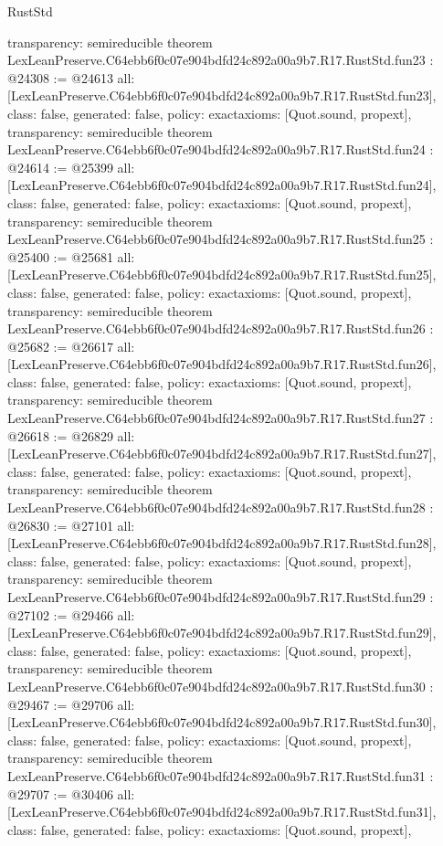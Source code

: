 \begin{lexlean}{RustStd}
\begin{coremodule}
{  transparency: semireducible
}
theorem LexLeanPreserve.C64ebb6f0c07e904bdfd24c892a00a9b7.R17.RustStd.fun23 : @24308 := @24613 {
  all: [LexLeanPreserve.C64ebb6f0c07e904bdfd24c892a00a9b7.R17.RustStd.fun23],
  class: false,
  generated: false,
  policy: exact{axioms: [Quot.sound, propext]},
  transparency: semireducible
}
theorem LexLeanPreserve.C64ebb6f0c07e904bdfd24c892a00a9b7.R17.RustStd.fun24 : @24614 := @25399 {
  all: [LexLeanPreserve.C64ebb6f0c07e904bdfd24c892a00a9b7.R17.RustStd.fun24],
  class: false,
  generated: false,
  policy: exact{axioms: [Quot.sound, propext]},
  transparency: semireducible
}
theorem LexLeanPreserve.C64ebb6f0c07e904bdfd24c892a00a9b7.R17.RustStd.fun25 : @25400 := @25681 {
  all: [LexLeanPreserve.C64ebb6f0c07e904bdfd24c892a00a9b7.R17.RustStd.fun25],
  class: false,
  generated: false,
  policy: exact{axioms: [Quot.sound, propext]},
  transparency: semireducible
}
theorem LexLeanPreserve.C64ebb6f0c07e904bdfd24c892a00a9b7.R17.RustStd.fun26 : @25682 := @26617 {
  all: [LexLeanPreserve.C64ebb6f0c07e904bdfd24c892a00a9b7.R17.RustStd.fun26],
  class: false,
  generated: false,
  policy: exact{axioms: [Quot.sound, propext]},
  transparency: semireducible
}
theorem LexLeanPreserve.C64ebb6f0c07e904bdfd24c892a00a9b7.R17.RustStd.fun27 : @26618 := @26829 {
  all: [LexLeanPreserve.C64ebb6f0c07e904bdfd24c892a00a9b7.R17.RustStd.fun27],
  class: false,
  generated: false,
  policy: exact{axioms: [Quot.sound, propext]},
  transparency: semireducible
}
theorem LexLeanPreserve.C64ebb6f0c07e904bdfd24c892a00a9b7.R17.RustStd.fun28 : @26830 := @27101 {
  all: [LexLeanPreserve.C64ebb6f0c07e904bdfd24c892a00a9b7.R17.RustStd.fun28],
  class: false,
  generated: false,
  policy: exact{axioms: [Quot.sound, propext]},
  transparency: semireducible
}
theorem LexLeanPreserve.C64ebb6f0c07e904bdfd24c892a00a9b7.R17.RustStd.fun29 : @27102 := @29466 {
  all: [LexLeanPreserve.C64ebb6f0c07e904bdfd24c892a00a9b7.R17.RustStd.fun29],
  class: false,
  generated: false,
  policy: exact{axioms: [Quot.sound, propext]},
  transparency: semireducible
}
theorem LexLeanPreserve.C64ebb6f0c07e904bdfd24c892a00a9b7.R17.RustStd.fun30 : @29467 := @29706 {
  all: [LexLeanPreserve.C64ebb6f0c07e904bdfd24c892a00a9b7.R17.RustStd.fun30],
  class: false,
  generated: false,
  policy: exact{axioms: [Quot.sound, propext]},
  transparency: semireducible
}
theorem LexLeanPreserve.C64ebb6f0c07e904bdfd24c892a00a9b7.R17.RustStd.fun31 : @29707 := @30406 {
  all: [LexLeanPreserve.C64ebb6f0c07e904bdfd24c892a00a9b7.R17.RustStd.fun31],
  class: false,
  generated: false,
  policy: exact{axioms: [Quot.sound, propext]},
}
\end{coremodule}
\end{lexlean}
